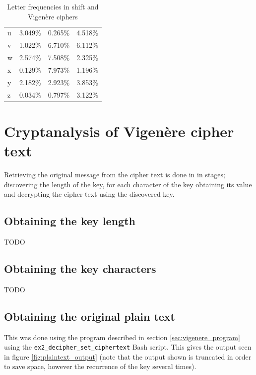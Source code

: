 \documentclass[a4paper]{article}
\newcommand{\Vigenere}{Vigen\`{e}re }
\begin{document}
\begin{table}[h]
\begin{tabular}{@{}lrrr@{}}
    u      & 3.049\%            & 0.265\%      & 4.518\%          \\
    v      & 1.022\%            & 6.710\%      & 6.112\%          \\
    w      & 2.574\%            & 7.508\%      & 2.325\%          \\
    x      & 0.129\%            & 7.973\%      & 1.196\%          \\
    y      & 2.182\%            & 2.923\%      & 3.853\%          \\
    z      & 0.034\%            & 0.797\%      & 3.122\%          \\
    \bottomrule
  \end{tabular}
  \caption{Letter frequencies in shift and \Vigenere ciphers}
  \label{table:letter_frequency_comparison}
\end{table}

\section{Cryptanalysis of \Vigenere cipher text}

Retrieving the original message from the cipher text is done in in stages;
discovering the length of the key, for each character of the key obtaining its
value and decrypting the cipher text using the discovered key.

\subsection{Obtaining the key length}

TODO

\subsection{Obtaining the key characters}

TODO

\subsection{Obtaining the original plain text}

This was done using the program described in section \ref{sec:vigenere_program}
using the \texttt{ex2\_decipher\_set\_ciphertext} Bash script. This gives the
output seen in figure \ref{fig:plaintext_output} (note that the output shown
is truncated in order to save space, however the recurrence of the key several
times).
\end{document}
